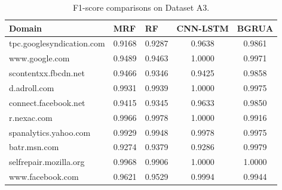 \documentclass[preprint,12pt]{elsarticle}
\begin{document}
\begin{table}[]
\centering
\caption{F1-score comparisons on Dataset A3.}
\label{tab8}
\begin{tabular}{lllcc}
\hline
\textbf{Domain}           & \textbf{MRF} & \textbf{RF} & \textbf{CNN-LSTM} & \textbf{BGRUA} \\ \hline
tpc.googlesyndication.com & 0.9168       & 0.9287      & 0.9638            & 0.9861        \\
www.google.com            & 0.9489       & 0.9463      & 1.0000            & 0.9971        \\
scontentxx.fbcdn.net      & 0.9466       & 0.9346      & 0.9425            & 0.9858        \\
d.adroll.com              & 0.9931       & 0.9939      & 1.0000            & 0.9975        \\
connect.facebook.net      & 0.9415       & 0.9345      & 0.9633            & 0.9850        \\
r.nexac.com               & 0.9966       & 0.9978      & 1.0000            & 0.9916        \\
spanalytics.yahoo.com     & 0.9929       & 0.9948      & 0.9978            & 0.9975        \\
batr.msn.com              & 0.9274       & 0.9379      & 0.9286            & 0.9979        \\
selfrepair.mozilla.org    & 0.9968       & 0.9906      & 1.0000            & 1.0000        \\
www.facebook.com          & 0.9621       & 0.9529      & 0.9994            & 0.9944        \\ \hline
\end{tabular}
\end{table}





\end{document}
